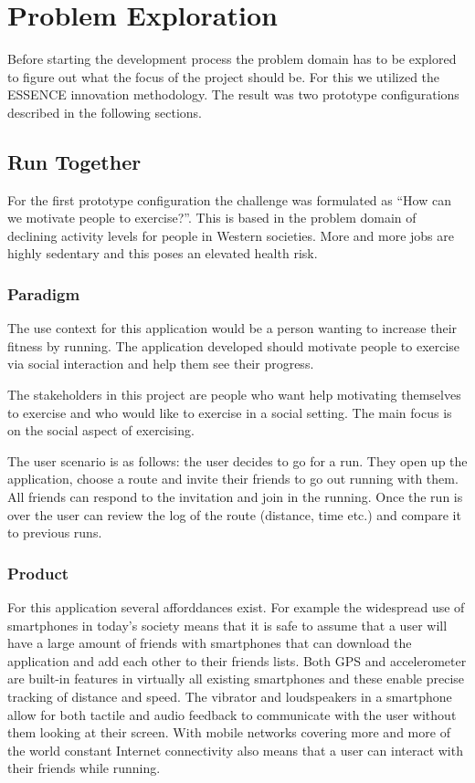 \section{Problem Exploration}
Before starting the development process the problem domain has to be explored to figure out what the focus of the project should be. For this we utilized the ESSENCE innovation methodology. The result was two prototype configurations described in the following sections.

\subsection{Run Together}
For the first prototype configuration the challenge was formulated as ``How can we motivate people to exercise?''. This is based in the problem domain of declining activity levels for people in Western societies. More and more jobs are highly sedentary and this poses an elevated health risk. 

\subsubsection{Paradigm}
The use context for this application would be a person wanting to increase their fitness by running. The application developed should motivate people to exercise via social interaction and help them see their progress.

The stakeholders in this project are people who want help motivating themselves to exercise and who would like to exercise in a social setting. The main focus is on the social aspect of exercising. 

The user scenario is as follows: the user decides to go for a run. They open up the application, choose a route and invite their friends to go out running with them. All friends can respond to the invitation and join in the running. Once the run is over the user can review the log of the route (distance, time etc.) and compare it to previous runs.  

\subsubsection{Product}
For this application several afforddances exist. For example the widespread use of smartphones in today's society means that it is safe to assume that a user will have a large amount of friends with smartphones that can download the application and add each other to their friends lists. Both \ac{GPS} and accelerometer are built-in features in virtually all existing smartphones and these enable precise tracking of distance and speed. The vibrator and loudspeakers in a smartphone allow for both tactile and audio feedback to communicate with the user without them looking at their screen. With mobile networks covering more and more of the world constant Internet connectivity also means that a user can interact with their friends while running.

